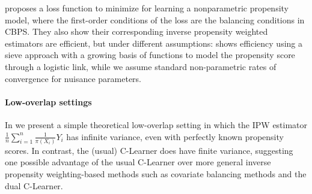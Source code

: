 \citet{zhao2019covariate} proposes a loss function to minimize for learning a nonparametric propensity model, where the first-order conditions of the loss are the balancing conditions in CBPS. %
They also show their corresponding inverse propensity weighted estimators are efficient, but under different assumptions:  
\citet{zhao2019covariate} shows efficiency using a sieve approach with a growing basis of functions %
to model the propensity score through a logistic link,
while we assume standard non-parametric rates of convergence for nuisance parameters. %




\vspace{-0.3em}
\paragraph{Low-overlap settings} In  we present a simple theoretical low-overlap setting in which the IPW estimator $\frac{1}{n}\sum_{i=1}^n \frac{1}{\pi(X_i)}Y_i$ has infinite variance, even with perfectly known propensity scores. 
In contrast, the (usual) C-Learner does have finite variance, suggesting one possible advantage of the usual C-Learner over more general inverse propensity weighting-based methods such as covariate balancing methods and the dual C-Learner.

\label{sec:balance-end}
